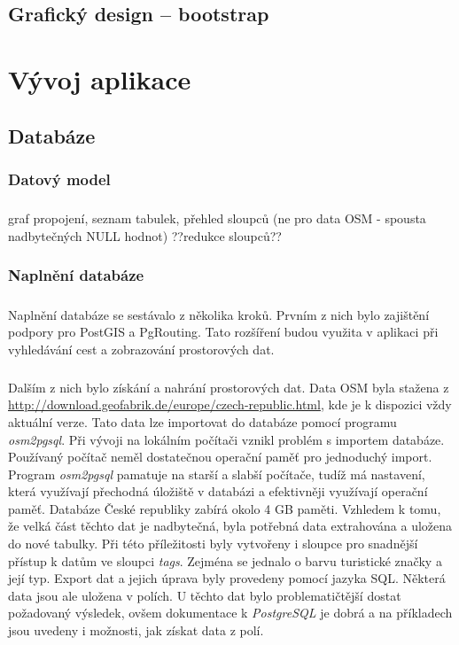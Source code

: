 \documentclass[11pt,a4paper,titlepage,oneside]{book}
\begin{document}
	\section{Grafický design -- bootstrap \cite{bootstrap}}



\chapter{Vývoj aplikace}
		\section{Databáze}
			\subsection{Datový model}
				\paragraph{} graf propojení, seznam tabulek, přehled sloupců (ne pro data OSM - spousta nadbytečných NULL hodnot) ??redukce sloupců??
			\subsection{Naplnění databáze}
				\paragraph{} Naplnění databáze se sestávalo z několika kroků. Prvním z nich bylo zajištění podpory pro PostGIS a PgRouting. Tato rozšíření budou využita v aplikaci při vyhledávání cest a zobrazování prostorových dat.
				\paragraph{}Dalším z nich bylo získání a nahrání prostorových dat. Data OSM byla stažena z  \url{http://download.geofabrik.de/europe/czech-republic.html}, kde je k dispozici vždy aktuální verze. Tato data lze importovat do databáze pomocí programu \textit{osm2pgsql}. Při vývoji na lokálním počítači vznikl problém s importem databáze. Používaný počítač neměl dostatečnou operační paměť pro jednoduchý import. Program \textit{osm2pgsql} pamatuje na starší a slabší počítače, tudíž má nastavení, která využívají přechodná úložiště v databázi a efektivněji využívají operační paměť. Databáze České republiky zabírá okolo 4 GB paměti. Vzhledem k tomu, že velká část těchto dat je nadbytečná, byla potřebná data extrahována a uložena do nové tabulky. Při této příležitosti byly vytvořeny i sloupce pro snadnější přístup k datům ve sloupci \textit{tags}. Zejména se jednalo o barvu turistické značky a její typ. Export dat a jejich úprava byly provedeny pomocí jazyka SQL. Některá data jsou ale uložena v polích. U těchto dat bylo problematičtější dostat požadovaný výsledek, ovšem dokumentace k \textit{PostgreSQL}\cite{PostgreSQL} je dobrá a na příkladech jsou uvedeny i možnosti, jak získat data z polí.
\end{document}
